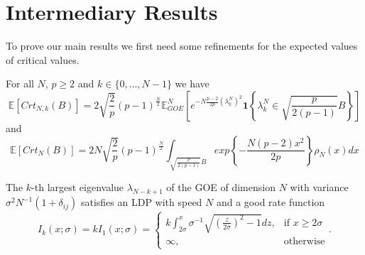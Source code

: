 \section{Intermediary Results}
To prove our main results we first need some refinements for the expected values of critical values.

\begin{theorem}
	For all $N$, $p\geq 2$ and $k\in\{0,\dots,N-1\}$ we have
	\begin{equation}\label{thm:2.1}
		\mathbb E[Crt_{N,k}(B)]=2\sqrt{\frac{2}{p}}(p-1)^{\frac{N}{2}}\mathbb E_{GOE}^N\left[e^{-N\frac{p-2}{2p}(\lambda_k^N)^2}\bm 1\left\{\lambda_k^N\in\sqrt{\frac{p}{2(p-1)}}B \right\}\right]
	\end{equation} and
	\begin{equation}\label{thm:2.2}
		\mathbb E[Crt_N(B)]=2N\sqrt{\frac{2}{p}}(p-1)^{\frac{N}{2}}\int_{\sqrt{\frac{p}{2(p-1)}}B}exp\left\{-\frac{N(p-2)x^2}{2p}\right\}\rho_N(x)dx
	\end{equation}
\end{theorem}

\begin{theorem}
	The $k$-th largest eigenvalue $\lambda_{N-k+1}$ of the GOE of dimension $N$ with variance $\sigma^2 N^{-1}(1+\delta_{ij})$  satisfies an LDP with speed $N$ and a good rate function 
	\begin{equation}\label{thm:A.1}
		I_k(x;\sigma)=k I_1(x;\sigma)=\begin{cases}
						k\int_{2\sigma}^x \sigma^{-1}\sqrt{(\frac{z}{2\sigma})^2-1}dz, &\mbox{if } x\geq 2\sigma \\
						\infty, &\mbox{otherwise}
					  \end{cases}.
	\end{equation}
\end{theorem}








